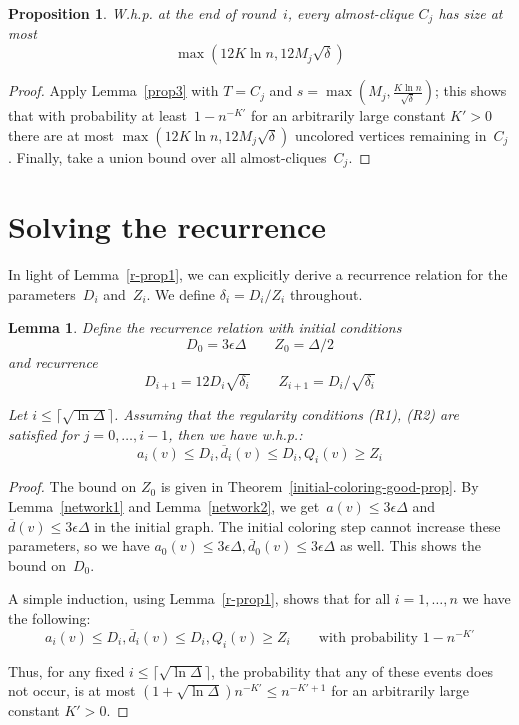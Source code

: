 \documentclass[11pt]{amsart}
\newtheorem{proposition}[theorem]{Proposition}
\newtheorem{lemma}[theorem]{Lemma}
\newcommand{\extd}{\ensuremath{{\overline{d}}}}
\begin{document}
\begin{proposition}
\label{aprop2}
W.h.p. at the end of round~$i$, every almost-clique $C_j$ has size at most
$$
\max(12 K\ln n, 12 M_j \sqrt{\delta} )
$$
\end{proposition}
\begin{proof}
 Apply Lemma~\ref{prop3} with $T = C_j$ and $s = \max( M_j, \frac{K \ln n}{\sqrt{\delta}})$; this shows that with probability at least~$1 - n^{-K'}$ for an arbitrarily large constant $K'>0$  there are at most $\max(12 K \ln n, 12 M_j \sqrt{\delta})$ uncolored vertices remaining in~$C_j$. Finally, take a union bound over all almost-cliques~$C_j$.
\end{proof}

\section{Solving the recurrence}
\label{sec:solver}
In light of Lemma~\ref{r-prop1}, we can explicitly derive a recurrence relation for the parameters~$D_i$ and~$Z_i$. We define $\delta_i = D_i/Z_i$ throughout.

\begin{lemma}
\label{r-prop0}
Define the recurrence relation with initial conditions
$$
D_0 = 3 \epsilon \Delta \qquad Z_0 = \Delta/2
$$
and recurrence
$$
D_{i+1} = 12 D_i \sqrt{\delta_i} \qquad Z_{i+1} = D_i/\sqrt{\delta_i}
$$

Let $i \leq \lceil \sqrt{\ln \Delta} \rceil$. Assuming that the regularity conditions (R1), (R2) are satisfied for $j = 0, \dots, i-1$, then we have w.h.p.:
$$
a_i(v) \leq D_i, \extd_i(v) \leq D_i, Q_i(v) \geq Z_i
$$
\end{lemma}
\begin{proof}
The bound on $Z_0$ is given in Theorem~\ref{initial-coloring-good-prop}. By Lemma~\ref{network1} and Lemma~\ref{network2}, we get~$a(v) \leq 3 \epsilon \Delta$ and  $\extd(v) \leq 3 \epsilon \Delta$ in the initial graph. The initial coloring step cannot increase these parameters, so we have $a_0(v) \leq 3 \epsilon \Delta, \extd_0(v) \leq 3 \epsilon \Delta$ as well. This shows the bound on~$D_0$.


A simple induction, using Lemma~\ref{r-prop1}, shows that for all $i = 1, \dots, n$ we have the following:
$$
a_i(v) \leq D_i, \extd_i(v) \leq D_i, Q_i(v)  \geq Z_i \qquad \text{with probability $1 - n^{-K'}$}
$$

Thus, for any fixed $i \leq \lceil \sqrt{\ln \Delta} \rceil$, the probability that any of these events does not occur, is at most $(1 + \sqrt{\ln \Delta}) n^{-K'} \leq n^{-K'+1}$ for an arbitrarily large constant $K'>0$.
\end{proof}
\end{document}
